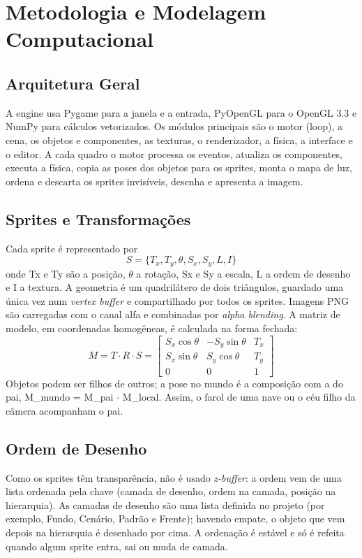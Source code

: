 \documentclass[conference]{IEEEtran}
\begin{document}
\section{Metodologia e Modelagem Computacional}

\subsection{Arquitetura Geral}
A engine usa Pygame para a janela e a entrada, PyOpenGL para o OpenGL 3.3 e NumPy para cálculos vetorizados. Os módulos principais são o motor (loop), a cena, os objetos e componentes, as texturas, o renderizador, a física, a interface e o editor. A cada quadro o motor processa os eventos, atualiza os componentes, executa a física, copia as poses dos objetos para os sprites, monta o mapa de luz, ordena e descarta os sprites invisíveis, desenha e apresenta a imagem.

\subsection{Sprites e Transformações}
Cada sprite é representado por
\begin{equation}
S = \{T_x, T_y, \theta, S_x, S_y, L, I\}
\end{equation}
onde Tx e Ty são a posição, $\theta$ a rotação, Sx e Sy a escala, L a ordem de desenho e I a textura. A geometria é um quadrilátero de dois triângulos, guardado uma única vez num \textit{vertex buffer} e compartilhado por todos os sprites. Imagens PNG são carregadas com o canal alfa e combinadas por \textit{alpha blending}. A matriz de modelo, em coordenadas homogêneas, é calculada na forma fechada:
\begin{equation}
M = T \cdot R \cdot S =
\begin{bmatrix}
S_x\cos\theta & -S_y\sin\theta & T_x\\
S_x\sin\theta & S_y\cos\theta & T_y\\
0 & 0 & 1
\end{bmatrix}
\end{equation}
Objetos podem ser filhos de outros; a pose no mundo é a composição com a do pai, M\_mundo = M\_pai $\cdot$ M\_local. Assim, o farol de uma nave ou o céu filho da câmera acompanham o pai.

\subsection{Ordem de Desenho}
Como os sprites têm transparência, não é usado \textit{z-buffer}: a ordem vem de uma lista ordenada pela chave (camada de desenho, ordem na camada, posição na hierarquia). As camadas de desenho são uma lista definida no projeto (por exemplo, Fundo, Cenário, Padrão e Frente); havendo empate, o objeto que vem depois na hierarquia é desenhado por cima. A ordenação é estável e só é refeita quando algum sprite entra, sai ou muda de camada.
\end{document}
